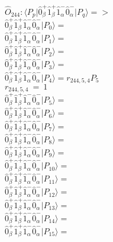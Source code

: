 \documentclass[14pt]{article}
\begin{document}
    $\hat{O}_{244}:  \langle{P_p}\vert \hat{0}_{\beta}^{+}\hat{1}_{\beta}^{+}\hat{1}_{\alpha}^{-}\hat{0}_{\alpha}^{-} \vert{P_q}\rangle => $ \\ 
    $ \hat{0}_{\beta}^{+}\hat{1}_{\beta}^{+}\hat{1}_{\alpha}^{-}\hat{0}_{\alpha}^{-} \vert{P_{0}}\rangle =  $ \\ 
    $ \hat{0}_{\beta}^{+}\hat{1}_{\beta}^{+}\hat{1}_{\alpha}^{-}\hat{0}_{\alpha}^{-} \vert{P_{1}}\rangle =  $ \\ 
    $ \hat{0}_{\beta}^{+}\hat{1}_{\beta}^{+}\hat{1}_{\alpha}^{-}\hat{0}_{\alpha}^{-} \vert{P_{2}}\rangle =  $ \\ 
    $ \hat{0}_{\beta}^{+}\hat{1}_{\beta}^{+}\hat{1}_{\alpha}^{-}\hat{0}_{\alpha}^{-} \vert{P_{3}}\rangle =  $ \\ 
    $ \hat{0}_{\beta}^{+}\hat{1}_{\beta}^{+}\hat{1}_{\alpha}^{-}\hat{0}_{\alpha}^{-} \vert{P_{4}}\rangle = {r}_{244,5,4}P_{5} $ \\ 
    ${r}_{244,5,4}\ =\ 1 $ \\ 
    $ \hat{0}_{\beta}^{+}\hat{1}_{\beta}^{+}\hat{1}_{\alpha}^{-}\hat{0}_{\alpha}^{-} \vert{P_{5}}\rangle =  $ \\ 
    $ \hat{0}_{\beta}^{+}\hat{1}_{\beta}^{+}\hat{1}_{\alpha}^{-}\hat{0}_{\alpha}^{-} \vert{P_{6}}\rangle =  $ \\ 
    $ \hat{0}_{\beta}^{+}\hat{1}_{\beta}^{+}\hat{1}_{\alpha}^{-}\hat{0}_{\alpha}^{-} \vert{P_{7}}\rangle =  $ \\ 
    $ \hat{0}_{\beta}^{+}\hat{1}_{\beta}^{+}\hat{1}_{\alpha}^{-}\hat{0}_{\alpha}^{-} \vert{P_{8}}\rangle =  $ \\ 
    $ \hat{0}_{\beta}^{+}\hat{1}_{\beta}^{+}\hat{1}_{\alpha}^{-}\hat{0}_{\alpha}^{-} \vert{P_{9}}\rangle =  $ \\ 
    $ \hat{0}_{\beta}^{+}\hat{1}_{\beta}^{+}\hat{1}_{\alpha}^{-}\hat{0}_{\alpha}^{-} \vert{P_{10}}\rangle =  $ \\ 
    $ \hat{0}_{\beta}^{+}\hat{1}_{\beta}^{+}\hat{1}_{\alpha}^{-}\hat{0}_{\alpha}^{-} \vert{P_{11}}\rangle =  $ \\ 
    $ \hat{0}_{\beta}^{+}\hat{1}_{\beta}^{+}\hat{1}_{\alpha}^{-}\hat{0}_{\alpha}^{-} \vert{P_{12}}\rangle =  $ \\ 
    $ \hat{0}_{\beta}^{+}\hat{1}_{\beta}^{+}\hat{1}_{\alpha}^{-}\hat{0}_{\alpha}^{-} \vert{P_{13}}\rangle =  $ \\ 
    $ \hat{0}_{\beta}^{+}\hat{1}_{\beta}^{+}\hat{1}_{\alpha}^{-}\hat{0}_{\alpha}^{-} \vert{P_{14}}\rangle =  $ \\ 
    $ \hat{0}_{\beta}^{+}\hat{1}_{\beta}^{+}\hat{1}_{\alpha}^{-}\hat{0}_{\alpha}^{-} \vert{P_{15}}\rangle =  $ \\ 
    
\end{document}
